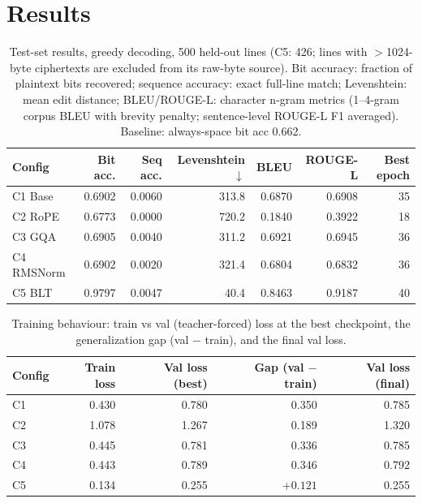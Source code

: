 \documentclass[11pt]{article}
\begin{document}
\section{Results}
\label{sec:results}

\begin{table}[h]
\centering
\caption{Test-set results, greedy decoding, 500 held-out lines (C5: 426; lines
with $>$1024-byte ciphertexts are excluded from its raw-byte source). Bit
accuracy: fraction of plaintext bits recovered; sequence accuracy: exact
full-line match; Levenshtein: mean edit distance; BLEU/ROUGE-L: character
n-gram metrics (1--4-gram corpus BLEU with brevity penalty; sentence-level
ROUGE-L F1 averaged). Baseline: always-space bit acc 0.662.}
\label{tab:main}
\begin{tabular}{lrrrrrr}
\toprule
Config & Bit acc. & Seq acc. & Levenshtein $\downarrow$ & BLEU & ROUGE-L & Best epoch \\
\midrule
C1 Base    & 0.6902 & 0.0060 & 313.8 & 0.6870 & 0.6908 & 35 \\
C2 RoPE    & 0.6773 & 0.0000 & 720.2 & 0.1840 & 0.3922 & 18 \\
C3 GQA     & 0.6905 & 0.0040 & 311.2 & 0.6921 & 0.6945 & 36 \\
C4 RMSNorm & 0.6902 & 0.0020 & 321.4 & 0.6804 & 0.6832 & 36 \\
C5 BLT     & 0.9797 & 0.0047 & 40.4  & 0.8463 & 0.9187 & 40 \\
\bottomrule
\end{tabular}
\end{table}

\begin{table}[h]
\centering
\caption{Training behaviour: train vs val (teacher-forced) loss at the best
checkpoint, the generalization gap (val $-$ train), and the final val loss.}
\label{tab:train}
\begin{tabular}{lrrrr}
\toprule
Config & Train loss & Val loss (best) & Gap (val $-$ train) & Val loss (final) \\
\midrule
C1 & 0.430 & 0.780 & 0.350 & 0.785 \\
C2 & 1.078 & 1.267 & 0.189 & 1.320 \\
C3 & 0.445 & 0.781 & 0.336 & 0.785 \\
C4 & 0.443 & 0.789 & 0.346 & 0.792 \\
C5 & 0.134 & 0.255 & $+0.121$ & 0.255 \\
\bottomrule
\end{tabular}
\end{table}
\end{document}
